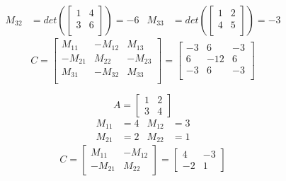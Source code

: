 \begin{example}
\begin{align*}
        M_{32} & = det(\begin{bmatrix}
            1 & 4 \\
            3 & 6 \\
        \end{bmatrix}) = -6  &
        M_{33} & = det(\begin{bmatrix}
            1 & 2 \\
            4 & 5 \\
        \end{bmatrix}) = -3
    \end{align*}
    \begin{equation*}
        C = \begin{bmatrix}
            M_{11}  & -M_{12} & M_{13}  \\
            -M_{21} & M_{22}  & -M_{23} \\
            M_{31}  & -M_{32} & M_{33}  \\
        \end{bmatrix} = \begin{bmatrix}
            -3 & 6   & -3 \\
            6  & -12 & 6  \\
            -3 & 6   & -3 \\
        \end{bmatrix}
    \end{equation*}
\end{example}
\begin{example}
    \begin{equation*}
        A = \begin{bmatrix}
            1 & 2 \\ 3 & 4
        \end{bmatrix}
    \end{equation*}
    \begin{align*}
        M_{11} & = 4 & M_{12} & = 3 \\
        M_{21} & = 2 & M_{22} & = 1
    \end{align*}
    \begin{equation*}
        C = \begin{bmatrix}
            M_{11}  & -M_{12} \\
            -M_{21} & M_22
        \end{bmatrix} = \begin{bmatrix}
            4 & -3 \\ -2 & 1
        \end{bmatrix}
    \end{equation*}
\end{example}
